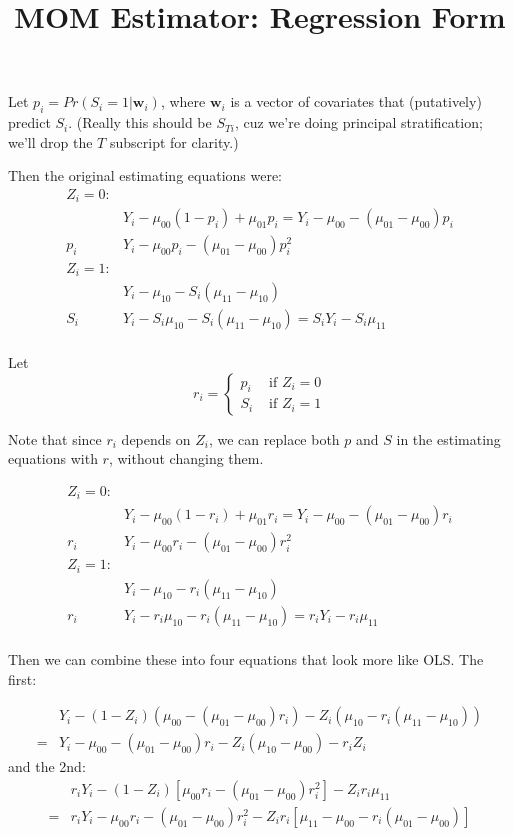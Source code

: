 \documentclass[11pt]{article} %
\title{MOM Estimator: Regression Form}
\begin{document}
\maketitle

Let $p_i=Pr(S_i=1|\bm{w}_i)$, where $\bm{w}_i$ is a vector of covariates that (putatively) predict $S_i$.
(Really this should be $S_{Ti}$, cuz we're doing principal stratification; we'll drop the $T$ subscript for clarity.)

Then the original estimating equations were:
\begin{align*}
  Z_i=0:&\\
  &Y_i-\mu_{00}(1-p_i)+\mu_{01}p_i=Y_i-\mu_{00}-(\mu_{01}-\mu_{00})p_i\\
  p_i&Y_i-\mu_{00}p_i-(\mu_{01}-\mu_{00})p_i^2\\
  Z_i=1:&\\
        &Y_i-\mu_{10}-S_i(\mu_{11}-\mu_{10})\\
  S_i&Y_i-S_i\mu_{10}-S_i(\mu_{11}-\mu_{10})=S_iY_i-S_i\mu_{11}\\
\end{align*}

Let
\begin{equation}
  r_i=
  \begin{cases}
    p_i&\text{ if }Z_i=0\\
    S_i&\text{ if }Z_i=1
  \end{cases}
\end{equation}

Note that since $r_i$ depends on $Z_i$, we can replace both $p$ and $S$ in the estimating equations with $r$, without changing them.

\begin{align*}
  Z_i=0:&\\
  &Y_i-\mu_{00}(1-r_i)+\mu_{01}r_i=Y_i-\mu_{00}-(\mu_{01}-\mu_{00})r_i\\
  r_i&Y_i-\mu_{00}r_i-(\mu_{01}-\mu_{00})r_i^2\\
  Z_i=1:&\\
        &Y_i-\mu_{10}-r_i(\mu_{11}-\mu_{10})\\
  r_i&Y_i-r_i\mu_{10}-r_i(\mu_{11}-\mu_{10})=r_iY_i-r_i\mu_{11}\\
\end{align*}

Then we can combine these into four equations that look more like OLS. The first:

\begin{align*}
  &Y_i-(1-Z_i)(\mu_{00}-(\mu_{01}-\mu_{00})r_i)-Z_i(\mu_{10}-r_i(\mu_{11}-\mu_{10}))\\
  =& Y_i-\mu_{00}-(\mu_{01}-\mu_{00})r_i-Z_i(\mu_{10}-\mu_{00})-r_iZ_i
\end{align*}
and the 2nd:
\begin{align*}
  &r_iY_i-(1-Z_i)\left[\mu_{00}r_i-(\mu_{01}-\mu_{00})r_i^2\right]-Z_ir_i\mu_{11}\\
  =&r_iY_i-\mu_{00}r_i-(\mu_{01}-\mu_{00})r_i^2-Z_ir_i\left[\mu_{11}-\mu_{00}-r_i(\mu_{01}-\mu_{00})\right]\\
\end{align*}
\end{document}
